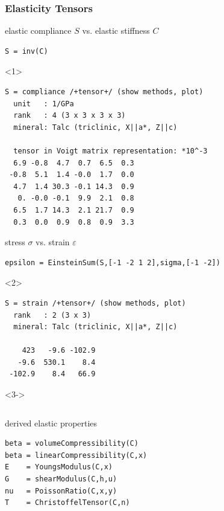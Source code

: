 \documentclass[compress]{beamer}
\begin{document}
\begin{frame}[fragile]
  \frametitle{Elasticity Tensors}

  \begin{overlayarea}{\textwidth}{\textheight}

elastic compliance $S$ vs. elastic stiffness $C$
  \begin{lstlisting}[style=input]
S = inv(C)
  \end{lstlisting}

  \begin{onlyenv}<1>
    \vspace{-0.3cm}
\begin{lstlisting}[style=output]
S = compliance /+tensor+/ (show methods, plot)
  unit   : 1/GPa
  rank   : 4 (3 x 3 x 3 x 3)
  mineral: Talc (triclinic, X||a*, Z||c)

  tensor in Voigt matrix representation: *10^-3
  6.9 -0.8  4.7  0.7  6.5  0.3
 -0.8  5.1  1.4 -0.0  1.7  0.0
  4.7  1.4 30.3 -0.1 14.3  0.9
   0. -0.0 -0.1  9.9  2.1  0.8
  6.5  1.7 14.3  2.1 21.7  0.9
  0.3  0.0  0.9  0.8  0.9  3.3
\end{lstlisting}
\end{onlyenv}

\pause
\medskip

stress $\sigma$ vs. strain $\varepsilon$
  \begin{lstlisting}[style=input]
epsilon = EinsteinSum(S,[-1 -2 1 2],sigma,[-1 -2])
  \end{lstlisting}

  \begin{onlyenv}<2>
    \vspace{-0.3cm}
\begin{lstlisting}[style=output]
S = strain /+tensor+/ (show methods, plot)
  rank   : 2 (3 x 3)
  mineral: Talc (triclinic, X||a*, Z||c)

    423   -9.6 -102.9
   -9.6  530.1    8.4
 -102.9    8.4   66.9
\end{lstlisting}
\end{onlyenv}

\pause
\medskip

\begin{onlyenv}<3->

  \begin{columns}
    \begin{column}{7.7cm}

      derived elastic properties
\begin{lstlisting}[style=input]
beta = volumeCompressibility(C)
beta = linearCompressibility(C,x)
E    = YoungsModulus(C,x)
G    = shearModulus(C,h,u)
nu   = PoissonRatio(C,x,y)
T    = ChristoffelTensor(C,n)
\end{lstlisting}



\end{column}
\end{columns}
\end{onlyenv}
\end{overlayarea}
\end{frame}
\end{document}
